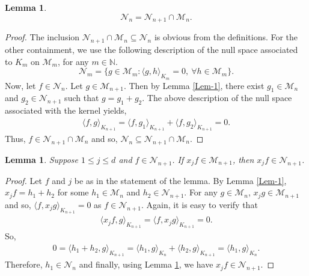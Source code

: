 \documentclass[11pt,reqno]{amsart}
\theoremstyle{plain}
\newtheorem{lemma}[theorem]{Lemma}
\theoremstyle{definition}
\numberwithin{equation}{section}
\begin{document}
	\begin{lemma} \label{Lem-2}
		$$\mathcal{N}_n = \mathcal{N}_{n+1} \cap \mathcal{M}_n.$$
	\end{lemma}
	\begin{proof}
		The inclusion $\mathcal{N}_{n+1} \cap \mathcal{M}_n \subseteq \mathcal{N}_n$ is obvious from the definitions. For the other containment, we use the following description of the null space associated to $K_m$ on $\mathcal{M}_m$, for any $m \in \mathbb{N}$.
		$$
		\mathcal{N}_m = \{g \in \mathcal{M}_m: \langle g, h \rangle_{K_m} = 0, \ \forall h\in \mathcal{M}_m\}.
		$$
		Now, let $f\in \mathcal{N}_n$. Let $g \in \mathcal{M}_{n+1}$. Then by Lemma \ref{Lem-1}, there exist $g_1 \in \mathcal{M}_n$ and $g_2 \in \mathcal{N}_{n+1}$ such that $g=g_1 + g_2$. The above description of the null space associated with the kernel yields,
		\begin{align*}
			\langle f, g\rangle_{K_{n+1}} = \langle f, g_1\rangle_{K_{n+1}} + \langle f, g_2\rangle_{K_{n+1}} =0.
		\end{align*}
		Thus, $f\in  \mathcal{N}_{n+1} \cap \mathcal{M}_n$ and so, $\mathcal{N}_n \subseteq  \mathcal{N}_{n+1} \cap \mathcal{M}_n.$
	\end{proof}
	
	
	\begin{lemma} \label{Lem-3}
		Suppose $1\leq j \leq d$ and $f\in \mathcal{N}_{n+1}$. If $x_j f \in \mathcal{M}_{n+1}$, then $x_j f \in \mathcal{N}_{n+1}$.
	\end{lemma}
	\begin{proof}
		Let $f$ and $j$ be as in the statement of the lemma. By Lemma \ref{Lem-1}, $x_jf = h_1 + h_2$ for some $h_1 \in \mathcal{M}_n$ and $h_2 \in \mathcal{N}_{n+1}$. For any $g\in \mathcal{M}_n$, $x_j g \in \mathcal{M}_{n+1}$ and so, $\langle f, x_j g\rangle_{K_{n+1}} = 0$ as $f\in \mathcal{N}_{n+1}$. Again, it is easy to verify that
		\begin{align*}
			\langle x_j f, g\rangle_{K_{n+1}} = \langle f, x_j g\rangle_{K_{n+1}} = 0.
		\end{align*}
		So,
		\begin{align*}
			0= \langle h_1 + h_2, g\rangle_{K_{n+1}} = \langle h_1, g\rangle_{K_{n}} + \langle h_2, g\rangle_{K_{n+1}} = \langle h_1, g\rangle_{K_{n}}.
		\end{align*}
		Therefore, $h_1 \in \mathcal{N}_n$ and finally, using Lemma \ref{Lem-2}, we have $x_j f \in \mathcal{N}_{n+1}$.
	\end{proof}
	
\end{document}

